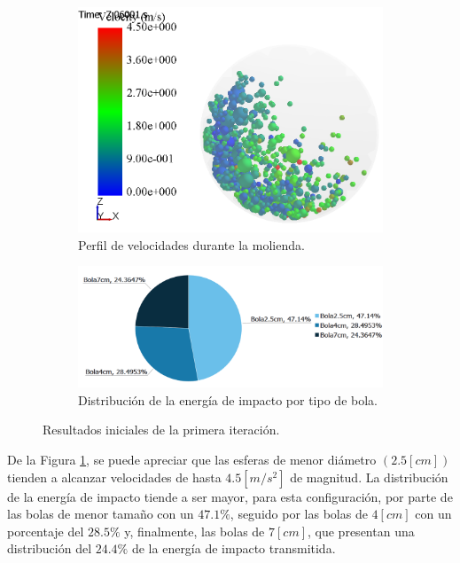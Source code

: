 \begin{figure}[h!]
	\centering
	\begin{subfigure}[b]{0.7\textwidth}
		\centering
		\includegraphics[width=\textwidth]{Images/Resultados/Sim1/sim1.PNG}
		\caption{Perfil de velocidades durante la molienda.}
	\end{subfigure}
	\hfill
	\begin{subfigure}[b]{0.94\textwidth}
		\centering
		\includegraphics[width=\textwidth]{Images/Resultados/Sim1/dist1.PNG}
	\caption{Distribuci\'on de la energ\'ia de impacto por tipo de bola.}
	\end{subfigure}
	\caption{Resultados iniciales de la primera iteraci\'on.}
	\label{resul1}
\end{figure}


\noindent
\justify

De la Figura \ref{resul1}, se puede apreciar que las esferas de menor di\'ametro $\left( 2.5 [cm] \right)$ tienden a alcanzar velocidades de hasta $4.5 \left[m/s^2 \right]$ de magnitud. La distribuci\'on de la energ\'ia de impacto tiende a ser mayor, para esta configuraci\'on, por parte de las bolas de menor tama\~no con un $47.1 \%$, seguido por las bolas de $4 [cm]$ con un porcentaje del $28.5 \%$ y, finalmente, las bolas de $7 [cm]$, que presentan una distribuci\'on del $24.4 \%$ de la energ\'ia de impacto transmitida.

